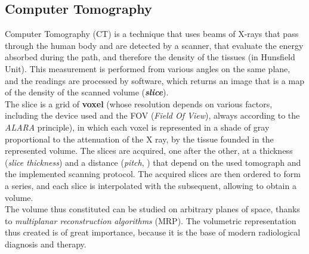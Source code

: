 \subsection{Computer Tomography}
Computer Tomography (CT) is a technique that uses beams of X-rays that pass through the human body and are detected by a scanner, that evaluate the energy absorbed during the path, and therefore the density of the tissues (in Hunsfield Unit). This measurement is performed from various angles on the same plane, and the readings are processed by software, which returns an image that is a map of the density of the scanned volume (\emph{\textbf{slice}}). \\
The slice is a grid of \textbf{voxel} (whose resolution depends on various factors, including the device used and the FOV (\emph{Field Of View}), always according to the \emph{ALARA} principle), in which each voxel is represented in a shade of gray proportional to the attenuation of the X ray, by the tissue founded in the represented volume. The slices are acquired, one after the other, at a thickness (\emph{slice thickness}) and a distance (\emph{pitch}, \parencite{Reference23}) that depend on the used tomograph and the implemented scanning protocol. The acquired slices are then ordered to form a series, and each slice is interpolated with the subsequent, allowing to obtain a volume. \\
The volume thus constituted can be studied on arbitrary planes of space, thanks to \emph{multiplanar reconstruction algorithms} (MRP). The volumetric representation thus created is of great importance, because it is the base of modern radiological diagnosis and therapy.

